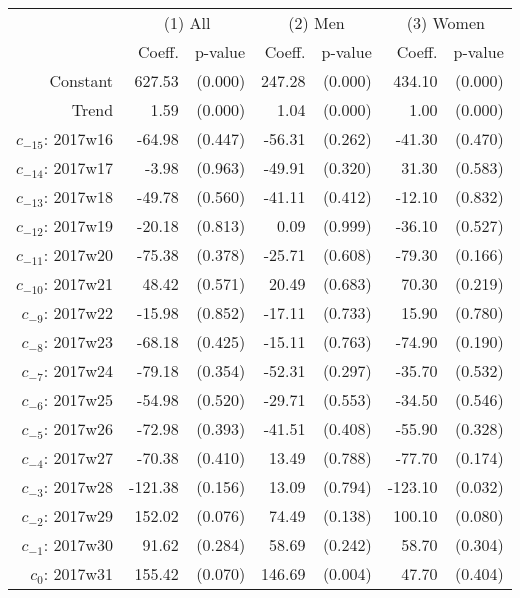 \begin{threeparttable}
\begin{tabular}{@{}r|rr|rr|rr@{}} \hline\hline
 & \multicolumn{2}{c|}{(1) All} & \multicolumn{2}{c|}{(2) Men} &  \multicolumn{2}{c}{(3) Women} \\ 
 & Coeff. & p-value  & Coeff. & p-value & Coeff. & p-value \\ \hline
 Constant & 627.53  & (0.000) & 247.28  & (0.000)  & 434.10  & (0.000) \\ 
 Trend &  1.59  & (0.000) &  1.04  & (0.000)  &  1.00  & (0.000) \\ 
 $ c_{-15} $: 2017w16 & -64.98  & (0.447) & -56.31  & (0.262)  & -41.30  & (0.470) \\ 
 $ c_{-14} $: 2017w17 & -3.98  & (0.963) & -49.91  & (0.320)  & 31.30  & (0.583) \\ 
 $ c_{-13} $: 2017w18 & -49.78  & (0.560) & -41.11  & (0.412)  & -12.10  & (0.832) \\ 
 $ c_{-12} $: 2017w19 & -20.18  & (0.813) &  0.09  & (0.999)  & -36.10  & (0.527) \\ 
 $ c_{-11} $: 2017w20 & -75.38  & (0.378) & -25.71  & (0.608)  & -79.30  & (0.166) \\ 
 $ c_{-10} $: 2017w21 & 48.42  & (0.571) & 20.49  & (0.683)  & 70.30  & (0.219) \\ 
 $ c_{-9} $: 2017w22 & -15.98  & (0.852) & -17.11  & (0.733)  & 15.90  & (0.780) \\ 
 $ c_{-8} $: 2017w23 & -68.18  & (0.425) & -15.11  & (0.763)  & -74.90  & (0.190) \\ 
 $ c_{-7} $: 2017w24 & -79.18  & (0.354) & -52.31  & (0.297)  & -35.70  & (0.532) \\ 
 $ c_{-6} $: 2017w25 & -54.98  & (0.520) & -29.71  & (0.553)  & -34.50  & (0.546) \\ 
 $ c_{-5} $: 2017w26 & -72.98  & (0.393) & -41.51  & (0.408)  & -55.90  & (0.328) \\ 
 $ c_{-4} $: 2017w27 & -70.38  & (0.410) & 13.49  & (0.788)  & -77.70  & (0.174) \\ 
 $ c_{-3} $: 2017w28 & -121.38  & (0.156) & 13.09  & (0.794)  & -123.10  & (0.032) \\ 
 $ c_{-2} $: 2017w29 & 152.02  & (0.076) & 74.49  & (0.138)  & 100.10  & (0.080) \\ 
 $ c_{-1} $: 2017w30 & 91.62  & (0.284) & 58.69  & (0.242)  & 58.70  & (0.304) \\ 
 $ c_{0} $: 2017w31 & 155.42  & (0.070) & 146.69  & (0.004)  & 47.70  & (0.404) \\ 

\end{tabular}
\end{threeparttable}
